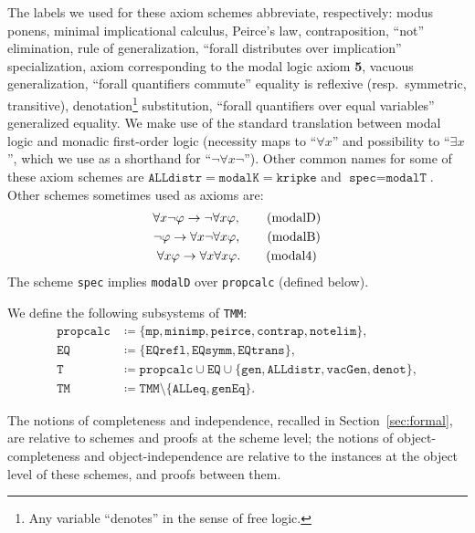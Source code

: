 \documentclass[11pt]{article}
\renewcommand*{\phi}{\varphi}
\theoremstyle{plain}
\theoremstyle{definition}
\theoremstyle{remark}
\begin{document}
The labels we used for these axiom schemes abbreviate, respectively:
modus ponens,
minimal implicational calculus,
Peirce's law,
contraposition,
``not'' elimination,
rule of generalization,
``forall distributes over implication\rlap{,}''
specialization,
axiom corresponding to the modal logic axiom \textbf{5},
vacuous generalization,
``forall quantifiers commute\rlap{,}''
equality is reflexive (resp.\ symmetric, transitive),
denotation\rlap{,}\footnote{
Any variable ``denotes'' in the sense of free logic.}
substitution, ``forall quantifiers over equal variables\rlap{,}'' generalized equality.
We make use of the standard translation between modal logic and monadic first-order logic
(necessity maps to ``$\forall x$'' and possibility to ``$\exists x$'', which we use as a
shorthand for ``$\neg \forall x \neg$'').
Other common names for some of these axiom schemes are
$\texttt{ALLdistr} = \texttt{modalK} = \texttt{kripke}$ and
$\texttt{spec} = \texttt{modalT}$.
Other schemes sometimes used as axioms are:
\begin{gather}
\forall x \neg \phi \to \neg \forall x \phi, \tag{\texttt{modalD}}\\
\neg \phi \to \forall x \neg \forall x \phi, \tag{\texttt{modalB}}\\
\forall x \phi \to \forall x \forall x \phi. \tag{\texttt{modal4}}
\end{gather}
The scheme \texttt{spec} implies \texttt{modalD} over \texttt{propcalc} (defined below).

We define the following subsystems of \texttt{TMM}:
\begin{align*}
\texttt{propcalc} &\coloneqq \{ \texttt{mp}, \texttt{minimp}, \texttt{peirce},
                                \texttt{contrap}, \texttt{notelim} \},\\
\texttt{EQ}       &\coloneqq \{ \texttt{EQrefl}, \texttt{EQsymm}, \texttt{EQtrans}\},\\
\texttt{T}        &\coloneqq \texttt{propcalc} \cup \texttt{EQ} \cup
                             \{ \texttt{gen}, \texttt{ALLdistr}, \texttt{vacGen}, \texttt{denot} \},\\
\texttt{TM}       &\coloneqq \texttt{TMM} \setminus \{ \texttt{ALLeq}, \texttt{genEq} \}.
\end{align*}

The notions of completeness and independence, recalled in Section~\ref{sec:formal}, are relative
to schemes and proofs at the scheme level;
the notions of object-completeness and object-independence are relative to the instances at the
object level of these schemes, and proofs between them.
\end{document}
